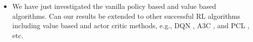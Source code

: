 \begin{itemize}
    \item We have just investigated the vanilla policy based and value based algorithms. Can our results be extended to other successful RL algorithms including value based and actor critic methods, e.g., DQN \citep{mnih2015human}, A3C \citep{mnih2016asynchronous}, and PCL \citep{nachum2017bridging}, etc.
\end{itemize}

\nocite{langley00}
\fi